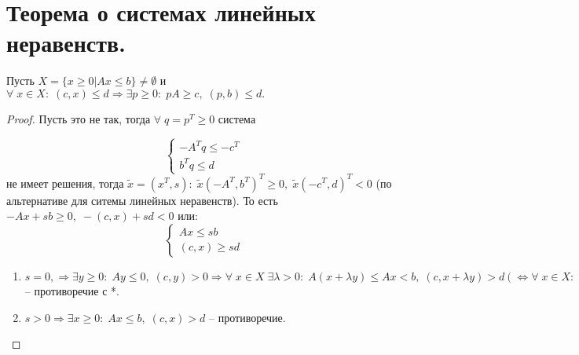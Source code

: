 \chapter{Теорема о системах линейных неравенств.}\label{cha:15}

\begin{theorem}
	Пусть $X = \{ x \geq 0 | Ax \leq b\} \neq \emptyset$ и $\forall \; x \in X: \; (c, x) \leq d \Rightarrow \exists p \geq 0: \; pA \geq c, \; (p, b) \leq d.$
\end{theorem}

\begin{proof}
	Пусть это не так, тогда $\forall \; q = p^T \geq 0 $ система

	$$
	\begin{cases}
		-A^T q \leq -c^T\\
		b^T q \leq d
	\end{cases}
	$$ не имеет решения, тогда $\tilde{x} = (x^T, s): \; \tilde{x} (-A^T, b^T)^T \geq 0, \; \tilde{x} (-c^T, d)^T < 0$ (по альтернативе для ситемы линейных неравенств). То есть $-Ax + sb \geq 0, \; -(c,x) + sd < 0$ или:
	$$
	\begin{cases}
		Ax \leq sb\\
		(c,x) \geq sd
	\end{cases}
	$$

	\begin{enumerate}
		\item $s = 0, \Rightarrow \exists y \geq 0: \; Ay \leq 0, \; (c, y) > 0 \Rightarrow \forall \; x \in X \; \exists \lambda > 0: \; A(x + \lambda y) \leq Ax < b, \; (c, x + \lambda y) > d (\Leftrightarrow \forall \; x \in X: \; (c, x) \leq d)^* \Rightarrow x + \lambda y \in X$ -- противоречие с *.
		\item  $s > 0 \Rightarrow \exists x \geq 0: \; Ax \leq b, \; (c, x) > d$ -- противоречие.
	\end{enumerate}
\end{proof}

